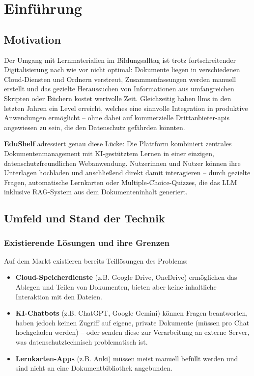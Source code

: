 
\chapter{Einführung}

\section{Motivation}

Der Umgang mit Lernmaterialien im Bildungsalltag ist trotz fortschreitender Digitalisierung nach wie vor nicht optimal: Dokumente liegen in verschiedenen Cloud-Diensten und Ordnern verstreut, Zusammenfassungen werden manuell erstellt und das gezielte Heraussuchen von Informationen aus umfangreichen Skripten oder Büchern kostet wertvolle Zeit. Gleichzeitig haben \glspl{llm} in den letzten Jahren ein Level erreicht, welches eine sinnvolle Integration in produktive Anwendungen ermöglicht -- ohne dabei auf kommerzielle Drittanbieter-\glspl{api} angewiesen zu sein, die den Datenschutz gefährden könnten.

\textbf{EduShelf} adressiert genau diese Lücke: Die Plattform kombiniert zentrales Dokumentenmanagement mit KI-gestütztem Lernen in einer einzigen, datenschutzfreundlichen Webanwendung. Nutzerinnen und Nutzer können ihre Unterlagen hochladen und anschließend direkt damit interagieren -- durch gezielte Fragen, automatische Lernkarten oder Multiple-Choice-Quizzes, die das LLM inklusive RAG-System aus dem Dokumenteninhalt generiert.

\newpage
\section{Umfeld und Stand der Technik}

\subsection{Existierende Lösungen und ihre Grenzen}

Auf dem Markt existieren bereits Teillösungen des Problems:

\begin{itemize}
    \item \textbf{Cloud-Speicherdienste} (z.B. Google Drive, OneDrive) ermöglichen das Ablegen und Teilen von Dokumenten, bieten aber keine inhaltliche Interaktion mit den Dateien.
    \item \textbf{KI-Chatbots} (z.B. ChatGPT, Google Gemini) können Fragen beantworten, haben jedoch keinen Zugriff auf eigene, private Dokumente (müssen pro Chat hochgeladen werden) -- oder senden diese zur Verarbeitung an externe Server, was datenschutztechnisch problematisch ist.
    \item \textbf{Lernkarten-Apps} (z.B. Anki) müssen meist manuell befüllt werden und sind nicht an eine Dokumentbibliothek angebunden.
\end{itemize}

